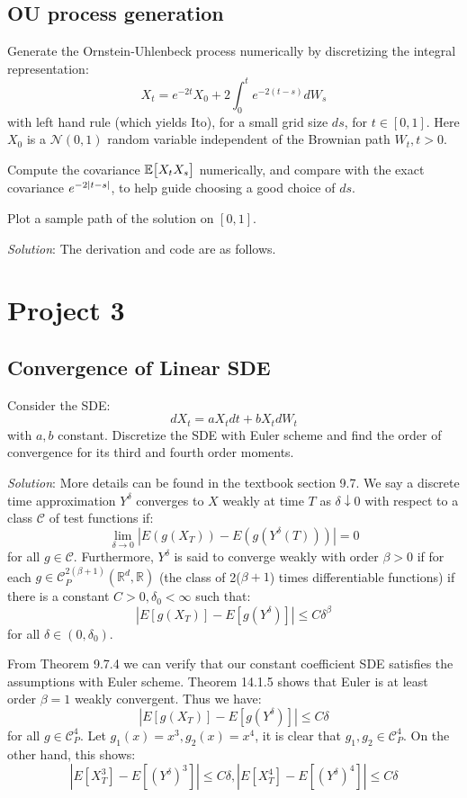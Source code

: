 \documentclass{article}
\begin{document}
\subsection{OU process generation} Generate the Ornstein-Uhlenbeck process numerically by discretizing the integral representation:
$$
    X_t = e^{-2t}X_0 + 2\int_0^te^{-2(t-s)}dW_s
$$ with left hand rule (which yields Ito), for a small grid size $ds$, for $t\in [0,1]$. Here $X_0$ is a $\mathcal{N}(0,1)$ random variable independent of the Brownian path $W_t,t>0$. 

Compute the covariance $\mathbb{E}\big[ {X_tX_s} \big]$ numerically, and compare with the exact covariance $e^{-2\abs{t-s}}$, to help guide choosing a good choice of $ds$. 

Plot a sample path of the solution on $[0,1]$.

\emph{Solution}: The derivation and code are as follows.



\section{Project 3}
\subsection{Convergence of Linear SDE} Consider the SDE:
$$
    dX_t=aX_tdt + bX_tdW_t
$$ with $a, b$ constant. Discretize the SDE with Euler scheme and find the order of convergence for its third and fourth order moments.

\emph{Solution}: More details can be found in the textbook section 9.7. We say a discrete time approximation $Y^{\delta}$ converges to $X$ weakly at time $T$ as $\delta\downarrow 0$ with respect to a class $\mathcal{C}$ of test functions if:
$$
    \lim_{\delta\rightarrow 0}|E(g(X_T)) - E(g(Y^{\delta}(T)))| = 0
$$ for all $g\in\mathcal{C}$. Furthermore, $Y^{\delta}$ is said to converge weakly with order $\beta>0$ if for each $g\in\mathcal{C}_P^{2(\beta+1)}(\mathbb{R}^d,\mathbb{R})$ (the class of 2($\beta+1$) times differentiable functions) if there is a constant $C>0,\delta_0<\infty$ such that:
$$
|E[g(X_T)] - E[g(Y^{\delta})]| \le C\delta^{\beta}
$$ for all $\delta\in (0,\delta_0)$.

From Theorem 9.7.4 we can verify that our constant coefficient SDE satisfies the assumptions with Euler scheme. Theorem 14.1.5 shows that Euler is at least order $\beta = 1$ weakly convergent. Thus we have:
$$
    |E[g(X_T)] - E[g(Y^{\delta})]| \le C\delta
$$ for all $g\in \mathcal{C}_P^{4}$. Let $g_1(x) = x^3, g_2(x) = x^4$, it is clear that $g_1,g_2\in\mathcal{C}_P^{4}$. On the other hand, this shows:
$$
    |E[X_T^3] - E[(Y^{\delta})^3]| \le C\delta, |E[X_T^4] - E[(Y^{\delta})^4]| \le C\delta
$$ 
\end{document}
